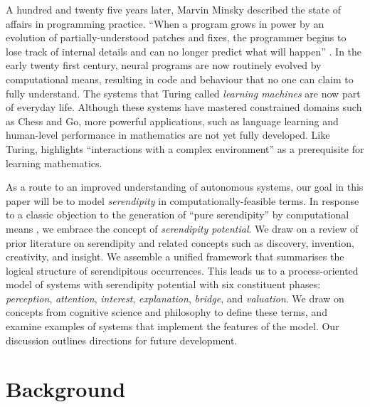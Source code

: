 A hundred and twenty five years later, Marvin Minsky described the state of affairs in programming practice.  ``When a program grows in power by an evolution of partially-understood patches and fixes, the programmer begins to lose track of internal details and can no longer predict what will happen'' \cite{minsky1967programming}.
In the early twenty first century, neural programs are now routinely evolved by computational means, resulting in code and behaviour that no one can claim to fully understand.  The systems that Turing called \emph{learning machines} \cite{turing1950mind} are now part of everyday life.  Although these systems have mastered constrained domains such as Chess and Go, more powerful applications, such as language learning and human-level performance in mathematics \cite{turing1948intelligentreport} are not yet fully developed.     
Like Turing, \citet[p.~2015]{sloman2008well} highlights ``interactions with a complex environment'' as a prerequisite for learning mathematics.    

As a route to an improved understanding of autonomous systems, our goal in this paper will be to model \emph{serendipity} in computationally-feasible terms. In response to a classic objection to the generation of ``pure serendipity'' by computational means \cite{van1994anatomy},  we embrace the concept of \emph{serendipity potential}.
We draw on a review of prior literature on serendipity and related concepts such as discovery, invention, creativity, and insight.  We assemble a unified framework that summarises the logical structure of serendipitous occurrences.
This leads us to a process-oriented model of systems with serendipity potential with six constituent phases:
\emph{perception}, \emph{attention}, \emph{interest}, \emph{explanation}, \emph{bridge}, and \emph{valuation}.
We draw on concepts from cognitive science and philosophy to define these terms, and examine examples of systems that implement the features of the model.
Our discussion outlines directions for future development.

\section{Background} \label{sec:background}

